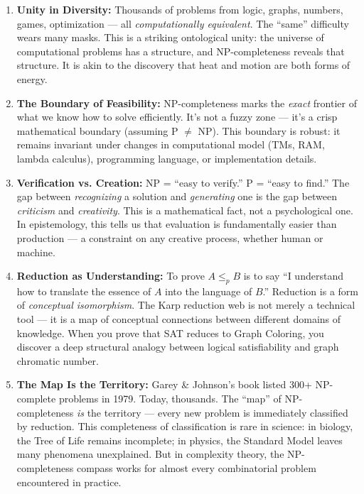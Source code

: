 \begin{enumerate}
\item \textbf{Unity in Diversity:} Thousands of problems from logic, graphs, numbers, games, optimization — all \emph{computationally equivalent}. The ``same'' difficulty wears many masks. This is a striking ontological unity: the universe of computational problems has a structure, and NP-completeness reveals that structure. It is akin to the discovery that heat and motion are both forms of energy.

\item \textbf{The Boundary of Feasibility:} NP-completeness marks the \emph{exact} frontier of what we know how to solve efficiently. It's not a fuzzy zone — it's a crisp mathematical boundary (assuming P $\neq$ NP). This boundary is robust: it remains invariant under changes in computational model (TMs, RAM, lambda calculus), programming language, or implementation details.

\item \textbf{Verification vs. Creation:} NP = ``easy to verify.'' P = ``easy to find.'' The gap between \emph{recognizing} a solution and \emph{generating} one is the gap between \emph{criticism} and \emph{creativity}. This is a mathematical fact, not a psychological one. In epistemology, this tells us that evaluation is fundamentally easier than production — a constraint on any creative process, whether human or machine.

\item \textbf{Reduction as Understanding:} To prove $A \le_p B$ is to say ``I understand how to translate the essence of $A$ into the language of $B$.'' Reduction is a form of \emph{conceptual isomorphism}. The Karp reduction web is not merely a technical tool — it is a map of conceptual connections between different domains of knowledge. When you prove that SAT reduces to Graph Coloring, you discover a deep structural analogy between logical satisfiability and graph chromatic number.

\item \textbf{The Map Is the Territory:} Garey \& Johnson's book listed 300+ NP-complete problems in 1979. Today, thousands. The ``map'' of NP-completeness \emph{is} the territory — every new problem is immediately classified by reduction. This completeness of classification is rare in science: in biology, the Tree of Life remains incomplete; in physics, the Standard Model leaves many phenomena unexplained. But in complexity theory, the NP-completeness compass works for almost every combinatorial problem encountered in practice.


\end{enumerate}
